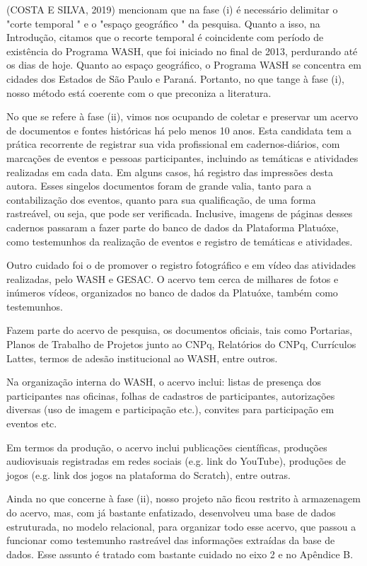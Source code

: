 (COSTA E SILVA, 2019) mencionam que na fase (i) é necessário delimitar o "corte temporal " e o "espaço geográfico " da pesquisa.  Quanto a isso, na Introdução, citamos que o recorte temporal é coincidente com período de existência do Programa WASH, que foi iniciado no final de 2013, perdurando até os dias de hoje. Quanto ao espaço geográfico, o Programa WASH se concentra em cidades dos Estados de São Paulo e Paraná. Portanto, no que tange à fase (i), nosso método está coerente com o que preconiza a literatura.

No que se refere à fase (ii), vimos nos ocupando de coletar e preservar um acervo de documentos e fontes históricas há pelo menos 10 anos. Esta candidata tem a prática recorrente de registrar sua vida profissional em cadernos-diários, com marcações de eventos e pessoas participantes, incluindo as temáticas e atividades realizadas em cada data. Em alguns casos, há registro das impressões desta autora. Esses singelos documentos foram de grande valia, tanto para a contabilização dos eventos, quanto para sua qualificação, de uma forma rastreável, ou seja, que pode ser verificada. Inclusive, imagens de páginas desses cadernos passaram a fazer parte do banco de dados da Plataforma Platuóxe, como testemunhos da realização de eventos e registro de temáticas e atividades.

Outro cuidado foi o de promover o registro fotográfico e em vídeo das atividades realizadas, pelo WASH e GESAC. O acervo tem cerca de milhares de fotos e inúmeros vídeos, organizados no banco de dados da Platuóxe, também como testemunhos.

Fazem parte do acervo de pesquisa, os documentos oficiais, tais como Portarias, Planos de Trabalho de Projetos junto ao CNPq, Relatórios do CNPq, Currículos Lattes, termos de adesão institucional ao WASH, entre outros.

Na organização interna do WASH, o acervo inclui: listas de presença dos participantes nas oficinas, folhas de cadastros de participantes, autorizações diversas (uso de imagem e participação etc.), convites   para participação em eventos etc.

Em termos da produção, o acervo inclui publicações científicas, produções audiovisuais registradas em redes sociais (e.g. link do YouTube), produções de jogos (e.g. link dos jogos na plataforma do Scratch), entre outras.

Ainda no que concerne à fase (ii), nosso projeto não ficou restrito à armazenagem do acervo, mas, com já bastante enfatizado, desenvolveu uma base de dados estruturada, no modelo relacional, para organizar todo esse acervo, que passou a funcionar como testemunho rastreável das informações extraídas da base de dados. Esse assunto é tratado com bastante cuidado no eixo 2 e no Apêndice B.

